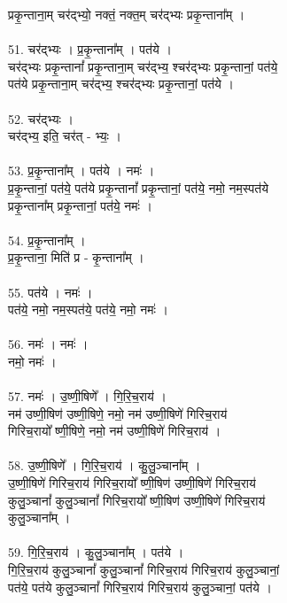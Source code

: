प्रकृ॒न्ताना॒म् चर॑द्भ्यो॒ नक्तं॒ नक्त॒म् चर॑द्भ्यः प्रकृ॒न्ताना᳚म् ।\\
\\
51. चर॑द्भ्यः । प्र॒कृ॒न्ताना᳚म् । पत॑ये ।\\
चर॑द्भ्यः प्रकृ॒न्तानां᳚ प्रकृ॒न्ताना॒म् चर॑द्भ्य॒ श्चर॑द्भ्यः प्रकृ॒न्तानां॒ पत॑ये॒\\
पत॑ये प्रकृ॒न्ताना॒म् चर॑द्भ्य॒ श्चर॑द्भ्यः प्रकृ॒न्तानां॒ पत॑ये ।\\
\\
52. चर॑द्भ्यः ।\\
चर॑द्भ्य॒ इति॒ चर॑त् - भ्यः॒ ।\\
\\
53. प्र॒कृ॒न्ताना᳚म् । पत॑ये । नमः॑ ।\\
प्र॒कृ॒न्तानां॒ पत॑ये॒ पत॑ये प्रकृ॒न्तानां᳚ प्रकृ॒न्तानां॒ पत॑ये॒ नमो॒ नम॒स्पत॑ये\\
प्रकृ॒न्ताना᳚म् प्रकृ॒न्तानां॒ पत॑ये॒ नमः॑ ।\\
\\
54. प्र॒कृ॒न्ताना᳚म् ।\\
प्र॒कृ॒न्ताना॒ मिति॑ प्र - कृ॒न्ताना᳚म् ।\\
\\
55. पत॑ये । नमः॑ ।\\
पत॑ये॒ नमो॒ नम॒स्पत॑ये॒ पत॑ये॒ नमो॒ नमः॑ ।\\
\\
56. नमः॑ । नमः॑ ।\\
नमो॒ नमः॑ ।\\
\\
57. नमः॑ । उ॒ष्णी॒षिणे᳚ । गि॒रि॒च॒राय॑ ।\\
नम॑ उष्णी॒षिण॑ उष्णी॒षिणे॒ नमो॒ नम॑ उष्णी॒षिणे॑ गिरिच॒राय॑\\
गिरिच॒रायो᳚ ष्णी॒षिणे॒ नमो॒ नम॑ उष्णी॒षिणे॑ गिरिच॒राय॑ ।\\
\\
58. उ॒ष्णी॒षिणे᳚ । गि॒रि॒च॒राय॑ । कु॒लु॒ञ्चाना᳚म् ।\\
उ॒ष्णी॒षिणे॑ गिरिच॒राय॑ गिरिच॒रायो᳚ ष्णी॒षिण॑ उष्णी॒षिणे॑ गिरिच॒राय॑\\
कुलु॒ञ्चानां᳚ कुलु॒ञ्चानां᳚ गिरिच॒रायो᳚ ष्णी॒षिण॑ उष्णी॒षिणे॑ गिरिच॒राय॑\\
कुलु॒ञ्चाना᳚म् ।\\
\\
59. गि॒रि॒च॒राय॑ । कु॒लु॒ञ्चाना᳚म् । पत॑ये ।\\
गि॒रि॒च॒राय॑ कुलु॒ञ्चानां᳚ कुलु॒ञ्चानां᳚ गिरिच॒राय॑ गिरिच॒राय॑ कुलु॒ञ्चानां॒\\
पत॑ये॒ पत॑ये कुलु॒ञ्चानां᳚ गिरिच॒राय॑ गिरिच॒राय॑ कुलु॒ञ्चानां॒ पत॑ये ।\\
